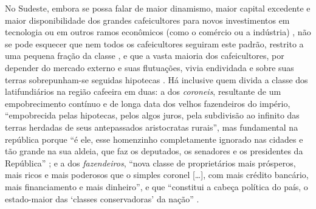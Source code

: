 No Sudeste, embora se possa falar de maior dinamismo, maior capital excedente e maior disponibilidade dos grandes cafeicultores para novos investimentos em tecnologia ou em outros ramos econômicos (como o comércio ou a indústria) \cite[p.~153-154]{CARONE1970inst}, não se pode esquecer que nem todos os cafeicultores seguiram este padrão, restrito a uma pequena fração da classe \cite[p.~32-38]{gorender_burguesia_1990}, e que a vasta maioria dos cafeicultores, por depender do mercado externo e suas flutuações, vivia endividada e sobre suas terras sobrepunham-se seguidas hipotecas \cite[p.~154]{CARONE1970inst}. Há inclusive quem divida a classe dos latifundiários na região cafeeira em duas: a dos \textit{coroneis}, resultante de um empobrecimento contínuo e de longa data dos velhos fazendeiros do império, ``empobrecida pelas hipotecas, pelos algos juros, pela subdivisão ao infinito das terras herdadas de seus antepassados aristocratas rurais'', mas fundamental na república porque ``é ele, esse homenzinho completamente ignorado nas cidades e tão grande na sua aldeia, que faz os deputados, os senadores e os presidentes da República'' \cite[pp.~146-148]{basbaum_histsinc_1967} ; e a dos \textit{fazendeiros}, ``nova classe de proprietários mais prósperos, mais ricos e mais poderosos que o simples coronel [\dots], com mais crédito bancário, mais financiamento e mais dinheiro'', e que ``constitui a cabeça política do país, o estado-maior das `classes conservadoras' da nação'' \cite[p.~149]{basbaum_histsinc_1967}.

